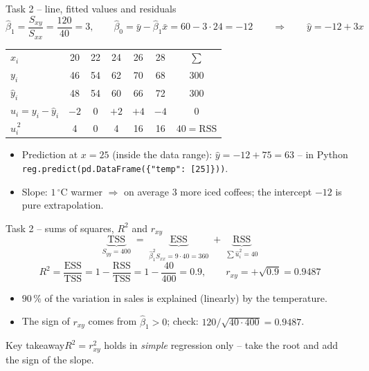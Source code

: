 \documentclass[aspectratio=169,11pt]{beamer}
\newcommand{\kernaussage}[1]{\begin{alertblock}{Key takeaway}#1\end{alertblock}}
\begin{document}
\begin{frame}{Task 2 -- line, fitted values and residuals}
  \[ \hat\beta_1 = \frac{S_{xy}}{S_{xx}} = \frac{120}{40} = 3, \qquad
     \hat\beta_0 = \bar y - \hat\beta_1\bar x = 60 - 3\cdot 24 = -12
     \qquad\Rightarrow\qquad \hat y = -12 + 3x \]
  \begin{center}\small
  \renewcommand{\arraystretch}{1.2}
  \begin{tabular}{lccccc|c}
    \toprule
    $x_i$ & 20 & 22 & 24 & 26 & 28 & $\sum$\\
    $y_i$ & 46 & 54 & 62 & 70 & 68 & 300\\
    $\hat y_i$ & 48 & 54 & 60 & 66 & 72 & 300\\
    $\hat u_i = y_i - \hat y_i$ & $-2$ & $0$ & $+2$ & $+4$ & $-4$ & $0$\\
    $\hat u_i^{\,2}$ & 4 & 0 & 4 & 16 & 16 & $40 = \text{RSS}$\\
    \bottomrule
  \end{tabular}
  \end{center}
  \begin{itemize}\setlength{\itemsep}{2pt}
    \item Prediction at $x = 25$ (inside the data range): $\hat y = -12 + 75 = 63$ -- in Python \texttt{reg.predict(pd.DataFrame(\{"temp":\ [25]\}))}.
    \item Slope: $1$\,$^{\circ}$C warmer $\Rightarrow$ on average $3$ more iced coffees; the intercept $-12$ is pure extrapolation.
  \end{itemize}
\end{frame}

\begin{frame}{Task 2 -- sums of squares, $R^2$ and $r_{xy}$}
  \[ \underbrace{\text{TSS}}_{S_{yy} = 400} \;=\; \underbrace{\text{ESS}}_{\hat\beta_1^2 S_{xx} = 9\cdot 40 = 360}
     \;+\; \underbrace{\text{RSS}}_{\sum\hat u_i^2 = 40} \]
  \[ R^2 = \frac{\text{ESS}}{\text{TSS}} = 1 - \frac{\text{RSS}}{\text{TSS}} = 1 - \frac{40}{400} = 0.9,
     \qquad r_{xy} = +\sqrt{0.9} = 0.9487 \]
  \begin{itemize}\setlength{\itemsep}{3pt}
    \item $90\,\%$ of the variation in sales is explained (linearly) by the temperature.
    \item The sign of $r_{xy}$ comes from $\hat\beta_1 > 0$; check: $120/\sqrt{40\cdot 400} = 0.9487$.
  \end{itemize}
  \kernaussage{$R^2 = r_{xy}^2$ holds in \emph{simple} regression only -- take the root and add the sign of the slope.}
\end{frame}
\end{document}
